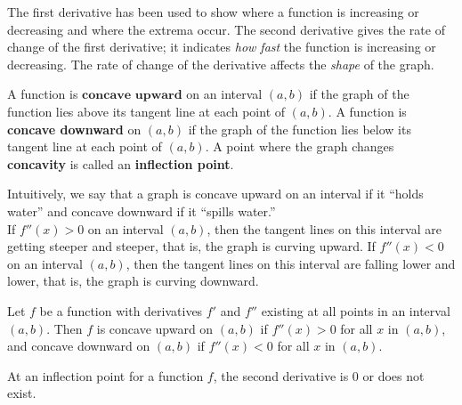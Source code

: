 \documentclass{book}
\begin{document}
The first derivative has been used to show where a function is increasing or decreasing and where the extrema occur. The second derivative gives the rate of change of the first derivative; it indicates \emph{how fast} the function is increasing or decreasing. The rate of change of the derivative affects the \emph{shape} of the graph. 

\begin{Def} A function is $\textbf{concave upward}$ on an interval $(a,b)$ if the graph of the function lies above its tangent line at each point of $(a,b)$. A function is \textbf{concave downward} on $(a,b)$ if the graph of the function lies below its tangent line at each point of $(a,b)$. A point where the graph changes \textbf{concavity} is called an \textbf{inflection point}.
\end{Def}\vs

 Intuitively, we say that a graph is concave upward on an interval if it ``holds water'' and concave downward if it ``spills water.''\\

If $f''(x) > 0$ on an interval $(a,b)$, then the tangent lines on this interval are getting steeper and steeper, that is, the graph is curving upward. If $f''(x) < 0$ on an interval $(a,b)$, then the tangent lines on this interval are falling lower and lower, that is, the graph is curving downward.

\begin{Prop} Let $f$ be a function with derivatives $f'$ and $f''$ existing at all points in an interval $(a,b)$. Then $f$ is concave upward on $(a,b)$ if $f''(x) > 0$ for all $x$ in $(a,b)$, and concave downward on $(a,b)$ if $f''(x) < 0$ for all $x$ in $(a,b)$.\end{Prop}\vspace{0.1 in}

\begin{Cor} At an inflection point for a function $f$, the second derivative is $0$ or does not exist.\end{Cor}\vspace{0.1 in}
\end{document}
